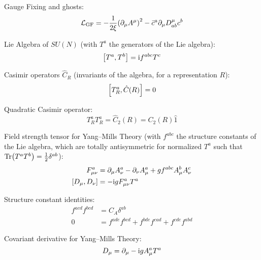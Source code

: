 		\noindent
		Gauge Fixing and ghosts:
		\begin{equation}
			\mathcal{L}_\text{GF} = -\frac{1}{2\xi} \qty(\partial_\mu A^\mu)^2 - \bar{c}^a \partial_\mu D^\mu_{ab} c^b
		\end{equation}

		\noindent
		Lie Algebra of $SU(N)$ (with $T^a$ the generators of the Lie algebra):
		\begin{equation}
			\comm{T^a}{T^b} = \i f^{abc} T^c
		\end{equation}

		\noindent
		Casimir operators $\hat{C}_R$ (invariants of the algebra, for a representation $R$):
		\begin{equation}
			\comm{T_R^a}{\hat{C}(R)} = 0
		\end{equation}

		\noindent
		Quadratic Casimir operator:
		\begin{equation}
			T^a_R T^a_R = \hat{C}_2(R) = C_2(R) \hat{1}
		\end{equation}

		\noindent
		Field strength tensor for Yang--Mills Theory (with $f^{abc}$ the structure constants of the Lie algebra, which are totally antisymmetric for normalized $T^a$ such that $\Tr(T^a T^b) = \frac{1}{2} \delta^{ab}$):
		\begin{equation}
			\begin{aligned}
				F^a_{\mu\nu} &= \partial_\mu A^a_\nu - \partial_\nu A^a_\mu + g f^{abc} A^b_\mu A^c_\nu \\
				\comm{D_\mu}{D_\nu} &= -\i g F_{\mu\nu}^a T^a
			\end{aligned}
		\end{equation}

		\noindent
		Structure constant identities:
		\begin{align}
			f^{acd} f^{bcd} &= C_A \delta^{ab} \\
			0 &= f^{ade} f^{bcd} + f^{bde} f^{cad} + f^{cde} f^{abd}
		\end{align}

		\noindent
		Covariant derivative for Yang--Mills Theory:
		\begin{equation}
			D_\mu = \partial_\mu - \mathrm{i} g A_\mu^a T^a
		\end{equation}

